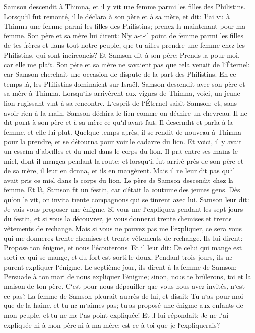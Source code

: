 \verse Samson descendit à Thimna, et il y vit une femme parmi les filles des Philistins. 
\verse Lorsqu`il fut remonté, il le déclara à son père et à sa mère, et dit: J`ai vu à Thimna une femme parmi les filles des Philistins; prenez-la maintenant pour ma femme. 
\verse Son père et sa mère lui dirent: N`y a-t-il point de femme parmi les filles de tes frères et dans tout notre peuple, que tu ailles prendre une femme chez les Philistins, qui sont incirconcis? Et Samson dit à son père: Prends-la pour moi, car elle me plaît. 
\verse Son père et sa mère ne savaient pas que cela venait de l`Éternel: car Samson cherchait une occasion de dispute de la part des Philistins. En ce temps là, les Philistins dominaient sur Israël. 
\verse Samson descendit avec son père et sa mère à Thimna. Lorsqu`ils arrivèrent aux vignes de Thimna, voici, un jeune lion rugissant vint à sa rencontre. 
\verse L`esprit de l`Éternel saisit Samson; et, sans avoir rien à la main, Samson déchira le lion comme on déchire un chevreau. Il ne dit point à son père et à sa mère ce qu`il avait fait. 
\verse Il descendit et parla à la femme, et elle lui plut. 
\verse Quelque temps après, il se rendit de nouveau à Thimna pour la prendre, et se détourna pour voir le cadavre du lion. Et voici, il y avait un essaim d`abeilles et du miel dans le corps du lion. 
\verse Il prit entre ses mains le miel, dont il mangea pendant la route; et lorsqu`il fut arrivé près de son père et de sa mère, il leur en donna, et ils en mangèrent. Mais il ne leur dit pas qu`il avait pris ce miel dans le corps du lion. 
\verse Le père de Samson descendit chez la femme. Et là, Samson fit un festin, car c`était la coutume des jeunes gens. 
\verse Dès qu`on le vit, on invita trente compagnons qui se tinrent avec lui. 
\verse Samson leur dit: Je vais vous proposer une énigme. Si vous me l`expliquez pendant les sept jours du festin, et si vous la découvrez, je vous donnerai trente chemises et trente vêtements de rechange. 
\verse Mais si vous ne pouvez pas me l`expliquer, ce sera vous qui me donnerez trente chemises et trente vêtements de rechange. Ils lui dirent: Propose ton énigme, et nous l`écouterons. 
\verse Et il leur dit: De celui qui mange est sorti ce qui se mange, et du fort est sorti le doux. Pendant trois jours, ils ne purent expliquer l`énigme. 
\verse Le septième jour, ils dirent à la femme de Samson: Persuade à ton mari de nous expliquer l`énigme; sinon, nous te brûlerons, toi et la maison de ton père. C`est pour nous dépouiller que vous nous avez invités, n`est-ce pas? 
\verse La femme de Samson pleurait auprès de lui, et disait: Tu n`as pour moi que de la haine, et tu ne m`aimes pas; tu as proposé une énigme aux enfants de mon peuple, et tu ne me l`as point expliquée! Et il lui répondait: Je ne l`ai expliquée ni à mon père ni à ma mère; est-ce à toi que je l`expliquerais? 
